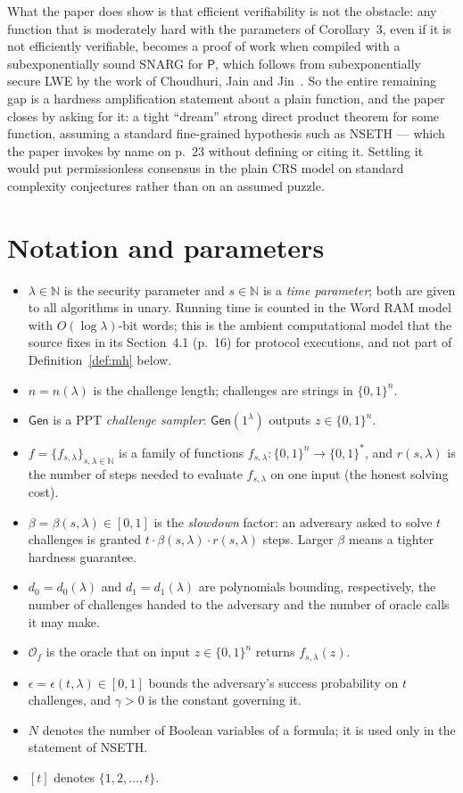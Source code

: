 \documentclass{conjura-conjecture}
\newcommand{\bits}{\{0,1\}}
\newcommand{\NN}{\mathbb{N}}
\newcommand{\Gen}{\mathsf{Gen}}
\newcommand{\Orc}{\mathcal{O}}
\begin{document}
What the paper does show is that efficient verifiability is not the obstacle: any function that is moderately hard with the parameters of Corollary~3, even if it is not efficiently verifiable, becomes a proof of work when compiled with a subexponentially sound SNARG for $\mathsf{P}$, which follows from subexponentially secure LWE by the work of Choudhuri, Jain and Jin~\cite{CJJ21}. So the entire remaining gap is a hardness amplification statement about a plain function, and the paper closes by asking for it: a tight ``dream'' strong direct product theorem for some function, assuming a standard fine-grained hypothesis such as NSETH --- which the paper invokes by name on p.~23 without defining or citing it. Settling it would put permissionless consensus in the plain CRS model on standard complexity conjectures rather than on an assumed puzzle.

\section{Notation and parameters}\label{sec:notation}

\begin{itemize}
\item $\lambda \in \NN$ is the security parameter and $s \in \NN$ is a \emph{time parameter}; both are given to all algorithms in unary. Running time is counted in the Word RAM model with $O(\log \lambda)$-bit words; this is the ambient computational model that the source fixes in its Section~4.1 (p.~16) for protocol executions, and not part of Definition~\ref{def:mh} below.
\item $n = n(\lambda)$ is the challenge length; challenges are strings in $\bits^{n}$.
\item $\Gen$ is a PPT \emph{challenge sampler}: $\Gen(1^{\lambda})$ outputs $z \in \bits^{n}$.
\item $f = \{f_{s,\lambda}\}_{s,\lambda \in \NN}$ is a family of functions $f_{s,\lambda} : \bits^{n} \to \bits^{*}$, and $r(s,\lambda)$ is the number of steps needed to evaluate $f_{s,\lambda}$ on one input (the honest solving cost).
\item $\beta = \beta(s,\lambda) \in [0,1]$ is the \emph{slowdown} factor: an adversary asked to solve $t$ challenges is granted $t \cdot \beta(s,\lambda) \cdot r(s,\lambda)$ steps. Larger $\beta$ means a tighter hardness guarantee.
\item $d_0 = d_0(\lambda)$ and $d_1 = d_1(\lambda)$ are polynomials bounding, respectively, the number of challenges handed to the adversary and the number of oracle calls it may make.
\item $\Orc_f$ is the oracle that on input $z \in \bits^{n}$ returns $f_{s,\lambda}(z)$.
\item $\epsilon = \epsilon(t,\lambda) \in [0,1]$ bounds the adversary's success probability on $t$ challenges, and $\gamma > 0$ is the constant governing it.
\item $N$ denotes the number of Boolean variables of a formula; it is used only in the statement of NSETH.
\item $[t]$ denotes $\{1,2,\dots,t\}$.
\end{itemize}
\end{document}
